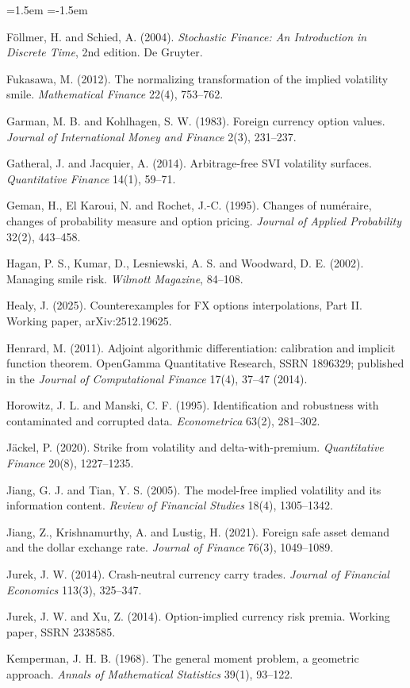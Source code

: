 \documentclass[11pt]{article}
\theoremstyle{remark}
\begin{document}
\begin{list}{}{\leftmargin=1.5em \itemindent=-1.5em \itemsep=2pt \parsep=0pt}
\item F\"ollmer, H. and Schied, A. (2004). \emph{Stochastic Finance: An Introduction in Discrete Time}, 2nd edition. De Gruyter.
\item Fukasawa, M. (2012). The normalizing transformation of the implied volatility smile. \emph{Mathematical Finance} 22(4), 753--762.
\item Garman, M. B. and Kohlhagen, S. W. (1983). Foreign currency option values. \emph{Journal of International Money and Finance} 2(3), 231--237.
\item Gatheral, J. and Jacquier, A. (2014). Arbitrage-free SVI volatility surfaces. \emph{Quantitative Finance} 14(1), 59--71.
\item Geman, H., El Karoui, N. and Rochet, J.-C. (1995). Changes of num\'eraire, changes of probability measure and option pricing. \emph{Journal of Applied Probability} 32(2), 443--458.
\item Hagan, P. S., Kumar, D., Lesniewski, A. S. and Woodward, D. E. (2002). Managing smile risk. \emph{Wilmott Magazine}, 84--108.
\item Healy, J. (2025). Counterexamples for FX options interpolations, Part II. Working paper, arXiv:2512.19625.
\item Henrard, M. (2011). Adjoint algorithmic differentiation: calibration and implicit function theorem. OpenGamma Quantitative Research, SSRN 1896329; published in the \emph{Journal of Computational Finance} 17(4), 37--47 (2014).
\item Horowitz, J. L. and Manski, C. F. (1995). Identification and robustness with contaminated and corrupted data. \emph{Econometrica} 63(2), 281--302.
\item J\"ackel, P. (2020). Strike from volatility and delta-with-premium. \emph{Quantitative Finance} 20(8), 1227--1235.
\item Jiang, G. J. and Tian, Y. S. (2005). The model-free implied volatility and its information content. \emph{Review of Financial Studies} 18(4), 1305--1342.
\item Jiang, Z., Krishnamurthy, A. and Lustig, H. (2021). Foreign safe asset demand and the dollar exchange rate. \emph{Journal of Finance} 76(3), 1049--1089.
\item Jurek, J. W. (2014). Crash-neutral currency carry trades. \emph{Journal of Financial Economics} 113(3), 325--347.
\item Jurek, J. W. and Xu, Z. (2014). Option-implied currency risk premia. Working paper, SSRN 2338585.
\item Kemperman, J. H. B. (1968). The general moment problem, a geometric approach. \emph{Annals of Mathematical Statistics} 39(1), 93--122.

\end{list}
\end{document}
